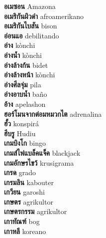 \textbf{ อเมซอน  } Amazona \\
\textbf{ อเมริกันผิวดำ  } afroamerikano \\
\textbf{ อเมริกันไบสัน  } bison \\
\textbf{ อ่อนแอ  } debilitando \\
\textbf{ อ่าง  } kònchi \\
\textbf{ อ่างน้ำ  } kònchi \\
\textbf{ อ่างล้างก้น  } bidet \\
\textbf{ อ่างล้างหน้า  } kònchi \\
\textbf{ อ่างศีลจุ่ม  } pila \\
\textbf{ อ่างอาบน้ำ  } baño \\
\textbf{ อ้าง  } apelashon \\
\textbf{ ฮอร์โมนจากต่อมหมวกไต  } adrenalina \\
\textbf{ ฮั้ว  } konspirá \\
\textbf{ ฮีบรู  } Hudiu \\
\textbf{ เกมบิงโก  } bingo \\
\textbf{ เกมส์ไพ่แบล็คแจ็ค  } blackjack \\
\textbf{ เกมอักษรไขว้  } krusigrama \\
\textbf{ เกรด  } grado \\
\textbf{ เกรมลิน  } kabouter \\
\textbf{ เกวียน  } garoshi \\
\textbf{ เกษตร  } agrikultor \\
\textbf{ เกษตรกรรม  } agrikultor \\
\textbf{ เกาทัณฑ์  } bog \\
\textbf{ เกาหลี  } koreano \\
